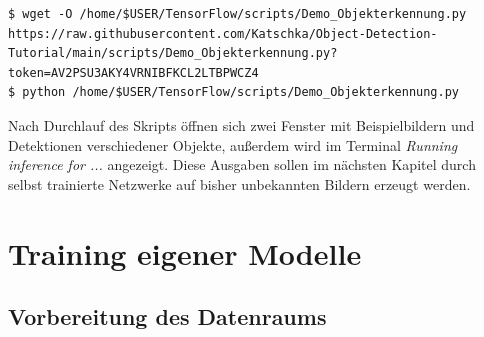 \documentclass[12pt, oneside]{article}
\begin{document}
\begin{verbatim}    
$ wget -O /home/$USER/TensorFlow/scripts/Demo_Objekterkennung.py https://raw.githubusercontent.com/Katschka/Object-Detection-Tutorial/main/scripts/Demo_Objekterkennung.py?token=AV2PSU3AKY4VRNIBFKCL2LTBPWCZ4
$ python /home/$USER/TensorFlow/scripts/Demo_Objekterkennung.py
\end{verbatim}
Nach Durchlauf des Skripts öffnen sich zwei Fenster mit Beispielbildern und Detektionen verschiedener Objekte, außerdem wird im Terminal \textit{Running inference for ...} angezeigt. Diese Ausgaben sollen im nächsten Kapitel durch selbst trainierte Netzwerke auf bisher unbekannten Bildern erzeugt werden.




\newpage


\section{Training eigener Modelle}

\subsection{Vorbereitung des Datenraums}
\end{document}
